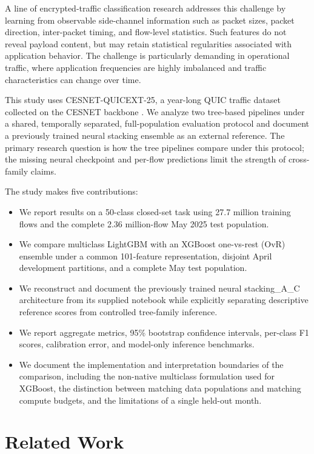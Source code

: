 \documentclass[conference]{IEEEtran}
\begin{document}
A line of encrypted-traffic classification research addresses this challenge by learning from observable side-channel information such as packet sizes, packet direction, inter-packet timing, and flow-level statistics. Such features do not reveal payload content, but may retain statistical regularities associated with application behavior. The challenge is particularly demanding in operational traffic, where application frequencies are highly imbalanced and traffic characteristics can change over time.

This study uses CESNET-QUICEXT-25, a year-long QUIC traffic dataset collected on the CESNET backbone \cite{cesnet-quicext25,waitingforquic}. We analyze two tree-based pipelines under a shared, temporally separated, full-population evaluation protocol and document a previously trained neural stacking ensemble as an external reference. The primary research question is how the tree pipelines compare under this protocol; the missing neural checkpoint and per-flow predictions limit the strength of cross-family claims.

The study makes five contributions:
\begin{itemize}
  \item We report results on a 50-class closed-set task using 27.7 million training flows and the complete 2.36 million-flow May 2025 test population.
  \item We compare multiclass LightGBM with an XGBoost one-vs-rest (OvR) ensemble under a common 101-feature representation, disjoint April development partitions, and a complete May test population.
  \item We reconstruct and document the previously trained neural stacking\_A\_C architecture from its supplied notebook while explicitly separating descriptive reference scores from controlled tree-family inference.
  \item We report aggregate metrics, 95\% bootstrap confidence intervals, per-class F1 scores, calibration error, and model-only inference benchmarks.
  \item We document the implementation and interpretation boundaries of the comparison, including the non-native multiclass formulation used for XGBoost, the distinction between matching data populations and matching compute budgets, and the limitations of a single held-out month.
\end{itemize}

\section{Related Work}
\label{sec:related}
\end{document}
